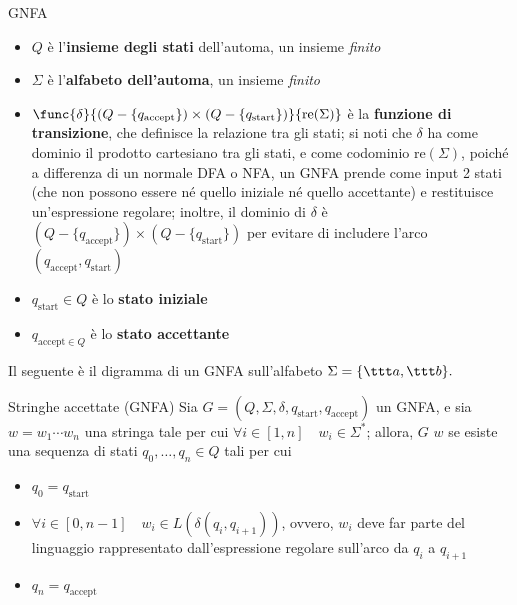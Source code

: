 \documentclass[a4paper, 12pt]{report}
\begin{document}
\begin{frameddefn}[label={def gnfa}]{GNFA}
        \begin{itemize}
            \item $Q$ è l'\textbf{insieme degli stati} dell'automa, un insieme \textit{finito}
            \item $\Sigma$ è l'\textbf{alfabeto dell'automa}, un insieme \textit{finito}
            \item $\func{\delta}{(Q - \{q_{\mathrm{accept}}\}) \times (Q - \{q_{\mathrm{start}}\})}{\mathrm{re}(\Sigma)}$ è la \textbf{funzione di transizione}, che definisce la relazione tra gli stati; si noti che $\delta$ ha come dominio il prodotto cartesiano tra gli stati, e come codominio $\mathrm{re}(\Sigma)$, poiché a differenza di un normale DFA o NFA, un GNFA prende come input 2 stati (che non possono essere né quello iniziale né quello accettante) e restituisce un'espressione regolare; inoltre, il dominio di $\delta$ è $(Q - \{q_{\mathrm{accept}}\}) \times (Q - \{q_{\mathrm{start}}\})$ per evitare di includere l'arco $(q_{\mathrm{accept}}, q_\mathrm{start})$
            \item $q_{\mathrm{start}} \in Q$ è lo \textbf{stato iniziale}
            \item $q_{\mathrm{accept} \in Q}$ è lo \textbf{stato accettante}
        \end{itemize}
    \end{frameddefn}

    \begin{example}[GNFA]
        Il seguente è il digramma di un GNFA sull'alfabeto $\Sigma = \{ \ttt a, \ttt b \}.$

    \end{example}

    \begin{frameddefn}{Stringhe accettate (GNFA)}
        Sia $G = (Q, \Sigma, \delta, q_{\mathrm{start}}, q_{\mathrm{accept}})$ un GNFA, e sia $w = w_1\cdots w_n$ una stringa tale per cui $\forall i \in [1, n] \quad w_i \in \Sigma^*$; allora, $G$  $w$ se esiste una sequenza di stati $q_0, \ldots, q_n \in Q$ tali per cui

        \begin{itemize}
            \item $q_0 = q_{\mathrm{start}}$
            \item $\forall i \in [0, n - 1] \quad w_i \in L(\delta(q_i, q_{i + 1}))$, ovvero, $w_i$ deve far parte del linguaggio rappresentato dall'espressione regolare sull'arco da $q_i$ a $q_{i + 1}$
            \item $q_n = q_{\mathrm{accept}}$
        \end{itemize}
    \end{frameddefn}
\end{document}
